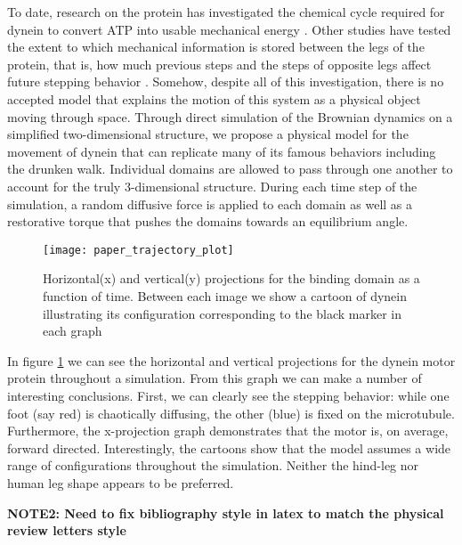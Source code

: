 \documentclass[a4paper, 11pt]{article}
\begin{document}
		To date, research on the protein has investigated the chemical cycle required for dynein to convert ATP into usable mechanical energy \cite{cianfrocco_mechanism_2015}. Other studies have tested the extent to which mechanical information is stored between the legs of the protein, that is, how much previous steps and the steps of opposite legs affect future stepping behavior \cite{puls_mutant_2003}. Somehow, despite all of this investigation, there is no accepted model that explains the motion of this system as a physical object moving through space. Through direct simulation of the Brownian dynamics on a simplified two-dimensional structure, we propose a physical model for the movement of dynein that can replicate many of its famous behaviors including the drunken walk. Individual domains are allowed to pass through one another to account for the truly 3-dimensional structure. During each time step of the simulation, a random diffusive force is applied to each domain as well as a restorative torque that pushes the domains towards an equilibrium angle. 
		
		\newpage
		
		\begin{figure}[!hbt]
			\centering
			\texttt{[image: paper\_trajectory\_plot]}
			\caption{Horizontal(x) and vertical(y) projections for the binding domain as a function of time. Between each image we show a cartoon of dynein illustrating its configuration corresponding to the black marker in each graph}
			\label{fig:trajectory}
		\end{figure}
		
		In figure \ref{fig:trajectory} we can see the horizontal and vertical projections for the dynein motor protein throughout a simulation. From this graph we can make a number of interesting conclusions. First, we can clearly see the stepping behavior: while one foot (say red) is chaotically diffusing, the other (blue) is fixed on the microtubule. Furthermore, the x-projection graph demonstrates that the motor is, on average, forward directed. Interestingly, the cartoons show that the model assumes a wide range of configurations throughout the simulation. Neither the hind-leg nor human leg shape appears to be preferred. 
		
		
		\noindent\textbf{NOTE2: Need to fix bibliography style in latex to match the physical review letters style} 




\end{document}
